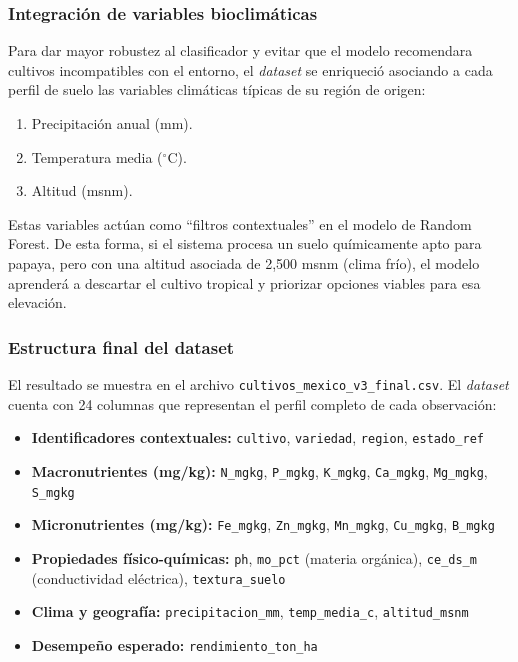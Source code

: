 \documentclass[12pt]{article}
\begin{document}
\subsubsection*{Integración de variables bioclimáticas}
Para dar mayor robustez al clasificador y evitar que el modelo recomendara cultivos incompatibles con el entorno, el \textit{dataset} se enriqueció asociando a cada perfil de suelo las variables climáticas típicas de su región de origen:
\begin{enumerate}
    \item Precipitación anual (mm).
    \item Temperatura media ($^\circ$C).
    \item Altitud (msnm).
\end{enumerate}
Estas variables actúan como ``filtros contextuales'' en el modelo de Random Forest. De esta forma, si el sistema procesa un suelo químicamente apto para papaya, pero con una altitud asociada de 2,500 msnm (clima frío), el modelo aprenderá a descartar el cultivo tropical y priorizar opciones viables para esa elevación.

\subsubsection{Estructura final del dataset}
El resultado se muestra en el archivo \texttt{cultivos\_mexico\_v3\_final.csv}. El \textit{dataset} cuenta con 24 columnas que representan el perfil completo de cada observación:

\begin{itemize}
    \item \textbf{Identificadores contextuales:} \colorbox{gray!15}{\texttt{cultivo}}, \colorbox{gray!15}{\texttt{variedad}}, \colorbox{gray!15}{\texttt{region}}, \colorbox{gray!15}{\texttt{estado\_ref}}
    \item \textbf{Macronutrientes (mg/kg):} \colorbox{gray!15}{\texttt{N\_mgkg}}, \colorbox{gray!15}{\texttt{P\_mgkg}}, \colorbox{gray!15}{\texttt{K\_mgkg}}, \colorbox{gray!15}{\texttt{Ca\_mgkg}}, \colorbox{gray!15}{\texttt{Mg\_mgkg}}, \colorbox{gray!15}{\texttt{S\_mgkg}}
    \item \textbf{Micronutrientes (mg/kg):} \colorbox{gray!15}{\texttt{Fe\_mgkg}}, \colorbox{gray!15}{\texttt{Zn\_mgkg}}, \colorbox{gray!15}{\texttt{Mn\_mgkg}}, \colorbox{gray!15}{\texttt{Cu\_mgkg}}, \colorbox{gray!15}{\texttt{B\_mgkg}}
    \item \textbf{Propiedades físico-químicas:} \colorbox{gray!15}{\texttt{ph}}, \colorbox{gray!15}{\texttt{mo\_pct}} (materia orgánica), \colorbox{gray!15}{\texttt{ce\_ds\_m}} (conductividad eléctrica), \colorbox{gray!15}{\texttt{textura\_suelo}}
    \item \textbf{Clima y geografía:} \colorbox{gray!15}{\texttt{precipitacion\_mm}}, \colorbox{gray!15}{\texttt{temp\_media\_c}}, \colorbox{gray!15}{\texttt{altitud\_msnm}}
    \item \textbf{Desempeño esperado:} \colorbox{gray!15}{\texttt{rendimiento\_ton\_ha}}
\end{itemize}
\end{document}
